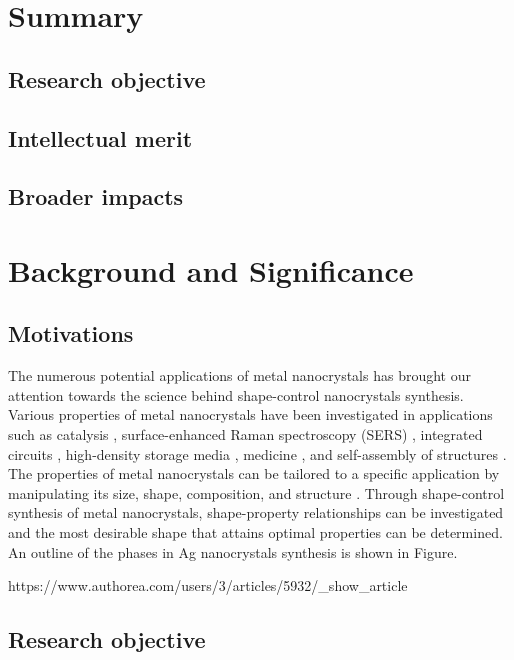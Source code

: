\section{Summary}

\subsection{Research objective}

\subsection{Intellectual merit}

\subsection{Broader impacts}

\section{Background and Significance}

\subsection{Motivations}
The numerous potential applications of metal nanocrystals has brought our attention towards the science behind shape-control nanocrystals synthesis. Various properties of metal nanocrystals have been investigated in applications such as catalysis \cite{Burda_2005}, surface-enhanced Raman spectroscopy (SERS) \cite{McLellan_2006}, integrated circuits \cite{Wiley_2006}, high-density storage media \cite{Aslam_2005}, medicine \cite{Au_2008}, and self-assembly of structures \cite{Glotzer_2007}. The properties of metal nanocrystals can be tailored to a specific application by manipulating its size, shape, composition, and structure \cite{Xia_2008}. Through shape-control synthesis of metal nanocrystals, shape-property relationships can be investigated and the most desirable shape that attains optimal properties can be determined. An outline of the phases in Ag nanocrystals synthesis is shown in Figure.

https://www.authorea.com/users/3/articles/5932/_show_article



\subsection{Research objective}

